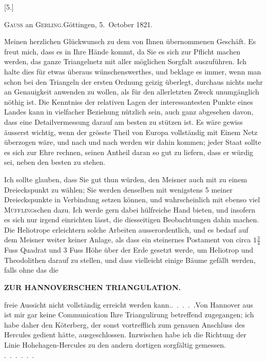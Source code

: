 \begin{center}
[5.]
\end{center}
\begin{center}
\textsc{Gauss} an \textsc{Gerling}.\quad Göttingen, 5.~October 1821.
\end{center}

\par\noindent\hspace*{\parindent}Meinen herzlichen Glückwunsch zu dem von Ihnen übernommenen Geschäft.
Es freut mich, dass es in Ihre Hände kommt, da Sie es sich zur Pflicht machen werden, das ganze Triangelnetz mit aller möglichen Sorgfalt auszuführen.
Ich halte dies für etwas überaus wünschenswerthes, und beklage es immer, wenn man schon bei den Triangeln der ersten Ordnung geizig überlegt, durchaus nichts mehr an Genauigkeit anwenden zu wollen, als für den allerletzten Zweck unumgänglich nöthig ist.
Die  Kenntniss der relativen Lagen der interessantesten Punkte eines Landes kann in vielfacher Beziehung nützlich sein, auch ganz abgesehen davon, dass eine Detailvermessung darauf am besten zu stützen ist.
Es wäre gewiss äusserst wichtig, wenn der grösste Theil von Europa vollständig mit Einem Netz überzogen wäre, und nach und nach werden wir dahin kommen; jeder Staat sollte es sich zur Ehre rechnen, seinen Antheil daran so gut zu liefern, dass er würdig sei, neben den besten zu stehen.

\par\noindent\hspace*{\parindent}Ich sollte glauben, dass Sie gut thun würden, den Meisner auch mit zu einem Dreieckspunkt zu wählen; Sie werden denselben  mit wenigstens 5 meiner Dreieckspunkte in Verbindung setzen können, und wahrscheinlich mit ebenso viel \textsc{Müffling}schen dazu.
Ich werde gern dabei hülfreiche Hand bieten, und insofern es sich nur irgend einrichten lässt, die diesseitigen Beobachtungen dahin machen.
Die Heliotrope erleichtern solche Arbeiten ausserordentlich, und es bedarf auf dem Meisner weiter keiner Anlage, als dass ein steinernes Postament von circa \(1\frac{3}{4}\) Fuss Quadrat und 3 Fuss Höhe über der Erde gesetzt werde, um Heliotrop und Theodolithen darauf zu stellen, und dass vielleicht einige Bäume gefällt werden, falls ohne das die
\par\clearpage
\noindent\null\hfill{\small\textbf{ZUR HANNOVERSCHEN TRIANGULATION.}}\hfill{}\par\medskip
\noindent freie Aussicht nicht vollständig erreicht werden kann.\quad\mbox{.\ .\ .\ .\ .}\quad Von Hannover aus ist mir gar keine Communication Ihre Triangulirung betreffend zugegangen; ich habe daher den Köterberg, der sonst vortrefflich zum genauen Anschluss des Hercules gedient hätte, ausgeschlossen.
Inzwischen habe ich die Richtung der Linie Hohehagen-Hercules zu den andern dortigen sorgfältig gemessen.\\
\mbox{.\ .\ .\ .\ .\ .}
